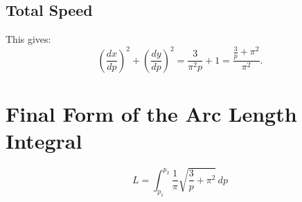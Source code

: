 \subsection*{Total Speed}
This gives:
\begin{equation}
\left(\frac{dx}{dp}\right)^2
+ \left(\frac{dy}{dp}\right)^2
= \frac{3}{\pi^2 p} + 1
= \frac{\frac{3}{p} + \pi^2}{\pi^2}.
\end{equation}

\section{Final Form of the Arc Length Integral}

\begin{satz}
\begin{equation}
\boxed{
L = \int_{p_1}^{p_2}
\frac{1}{\pi}\sqrt{\frac{3}{p} + \pi^2}\, dp
}
\end{equation}
\end{satz}
